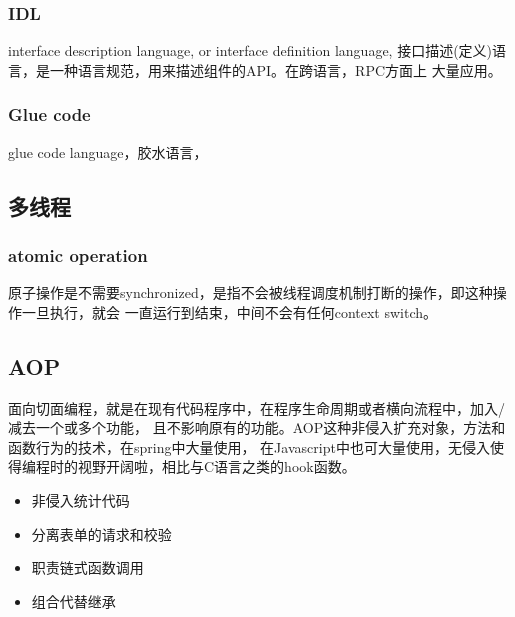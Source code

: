 \subsubsection{IDL}
interface description language, or interface definition language,
接口描述(定义)语言，是一种语言规范，用来描述组件的API。在跨语言，RPC方面上
大量应用。

\subsubsection{Glue code}
glue code language，胶水语言，

\subsection{多线程}

\subsubsection{atomic operation}
原子操作是不需要synchronized，是指不会被线程调度机制打断的操作，即这种操作一旦执行，就会
一直运行到结束，中间不会有任何context switch。

\subsection{AOP}
面向切面编程，就是在现有代码程序中，在程序生命周期或者横向流程中，加入/减去一个或多个功能，
且不影响原有的功能。AOP这种非侵入扩充对象，方法和函数行为的技术，在spring中大量使用，
在Javascript中也可大量使用，无侵入使得编程时的视野开阔啦，相比与C语言之类的hook函数。
\begin{itemize}
    \item {非侵入统计代码}
    \item {分离表单的请求和校验}
    \item {职责链式函数调用}
    \item {组合代替继承}
\end{itemize}

